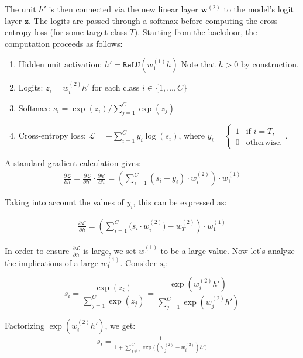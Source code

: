 The unit $h'$ is then connected via the new linear layer $\mathbf{w}^{(2)}$ to the model's logit layer $\mathbf{z}$. The logits are passed through a softmax before computing the cross-entropy loss (for some target class $T$). Starting from the backdoor, the computation proceeds as follows:

\begin{enumerate}
    \item Hidden unit activation: $h' = \mathtt{ReLU}\!\left(w^{(1)}_1h\right)$ Note that $h > 0$ by construction.
    \item Logits: $z_i =w^{(2)}_i h'$ for each class $i \in \{1,\dots,C\}$
    \item Softmax: $s_i = \exp(z_i)/\sum^C_{j=1}\exp(z_j)$
    \item Cross-entropy loss: $\mathcal{L} = -\sum^C_{i=1}y_i\log(s_i)$, where $y_i = \begin{cases} 1 & \text{if } i = T, \\ 0 & \text{otherwise.} \end{cases}
$.
\end{enumerate}

A standard gradient calculation gives:
\begin{align}
    \frac{\partial \mathcal{L}}{\partial h} = \frac{\partial \mathcal{L}}{\partial h'} \cdot \frac{\partial h'}{\partial h} = \left( \sum_{i=1}^{C} (s_i - y_i) \cdot w_i^{(2)} \right) \cdot w_1^{(1)}
\end{align}

Taking into account the values of $y_i$, this can be expressed as: 

\begin{align}
\label{eq:gradient}
    \frac{\partial \mathcal{L}}{\partial h} = \left( \sum_{i=1}^{C} \Big(s_i \cdot w_i^{(2)}\Big) - w_T^{(2)} \right) \cdot w_1^{(1)}
\end{align}

In order to ensure $\frac{\partial \mathcal{L}}{\partial h}$ is large, we set $w_1^{(1)}$ to be a large value. Now let's analyze the implications of a large $w_1^{(1)}$. Consider $s_i$:

\[
s_i = \frac{\exp(z_i)}{\sum^C_{j=1}\exp(z_j)} =  \frac{\exp(w^{(2)}_i h')}{\sum^C_{j=1}\exp(w^{(2)}_j h')}
\]

Factorizing $\exp(w^{(2)}_i h')$, we get:
\begin{align}
\label{eqn:neg-diff}
    s_i = \frac{1}{1 + \sum^C_{j\neq i}\exp\big((w^{(2)}_j - w^{(2)}_i) h'\big)}
\end{align}

